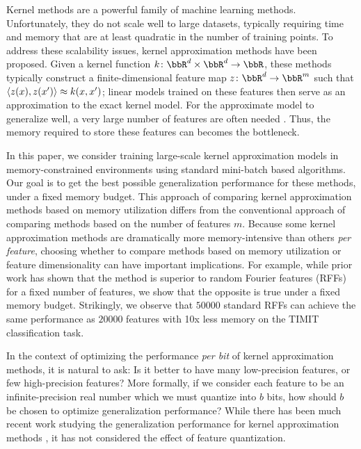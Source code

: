 
Kernel methods are a powerful family of machine learning methods.  Unfortunately, they do not scale well to large datasets, typically requiring time and memory that are at least quadratic in the number of training points. To address these scalability issues, kernel approximation methods have been proposed. Given a kernel function $k\colon\RR^d\times\RR^d\rightarrow \RR$, these methods typically construct a finite-dimensional feature map $z\colon \RR^d \rightarrow \RR^m$ such that $\langle z(x),z(x') \rangle \approx k(x,x')$; linear models trained on these features then serve as an approximation to the exact kernel model. For the approximate model to generalize well, a very large number of features are often needed \citep{rahimi08kitchen,block16,may2017}. Thus, the memory required to store these features can becomes the bottleneck.

In this paper, we consider training large-scale kernel approximation models in memory-constrained environments using standard mini-batch based algorithms. Our goal is to get the best possible generalization performance for these methods, under a fixed memory budget. This approach of comparing kernel approximation methods based on memory utilization differs from the conventional approach of comparing methods based on the number of features $m$. Because some kernel approximation methods are dramatically more memory-intensive than others \textit{per feature}, choosing whether to compare methods based on memory utilization or feature dimensionality can have important implications. For example, while prior work \citep{nysvsrff12} has shown that the \Nystrom method \citep{nystrom} is superior to random Fourier features (RFFs) \citep{rahimi07random} for a fixed number of features, we show that the opposite is true under a fixed memory budget. Strikingly, we observe that $\num[group-separator={,}]{50000}$ standard RFFs can achieve the same performance as $\num[group-separator={,}]{20000}$ \Nystrom features with 10x less memory on the TIMIT classification task.

In the context of optimizing the performance \textit{per bit} of kernel approximation methods, it is natural to ask: Is it better to have many low-precision features, or few high-precision features? More formally, if we consider each feature to be an infinite-precision real number which we must quantize into $b$ bits, how should $b$ be chosen to optimize generalization performance? While there has been much recent work studying the generalization performance for kernel approximation methods \citep{rudi17,avron17,musco17,bach17}, it has not considered the effect of feature quantization.

